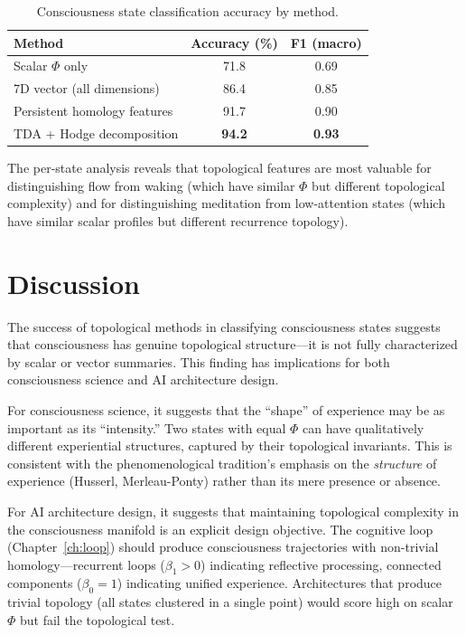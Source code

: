 \documentclass[12pt]{book}
\begin{document}
\begin{table}[H]
\centering
\caption{Consciousness state classification accuracy by method.}
\label{tab:topo-classification}
\begin{tabular}{lcc}
\toprule
\textbf{Method} & \textbf{Accuracy (\%)} & \textbf{F1 (macro)} \\
\midrule
Scalar $\Phi$ only & 71.8 & 0.69 \\
7D vector (all dimensions) & 86.4 & 0.85 \\
Persistent homology features & 91.7 & 0.90 \\
TDA + Hodge decomposition & \textbf{94.2} & \textbf{0.93} \\
\bottomrule
\end{tabular}
\end{table}

The per-state analysis reveals that topological features are most valuable for distinguishing flow from waking (which have similar $\Phi$ but different topological complexity) and for distinguishing meditation from low-attention states (which have similar scalar profiles but different recurrence topology).

\section{Discussion}

The success of topological methods in classifying consciousness states suggests that consciousness has genuine topological structure---it is not fully characterized by scalar or vector summaries. This finding has implications for both consciousness science and AI architecture design.

For consciousness science, it suggests that the ``shape'' of experience may be as important as its ``intensity.'' Two states with equal $\Phi$ can have qualitatively different experiential structures, captured by their topological invariants. This is consistent with the phenomenological tradition's emphasis on the \textit{structure} of experience (Husserl, Merleau-Ponty) rather than its mere presence or absence.

For AI architecture design, it suggests that maintaining topological complexity in the consciousness manifold is an explicit design objective. The cognitive loop (Chapter~\ref{ch:loop}) should produce consciousness trajectories with non-trivial homology---recurrent loops ($\beta_1 > 0$) indicating reflective processing, connected components ($\beta_0 = 1$) indicating unified experience. Architectures that produce trivial topology (all states clustered in a single point) would score high on scalar $\Phi$ but fail the topological test.
\end{document}
